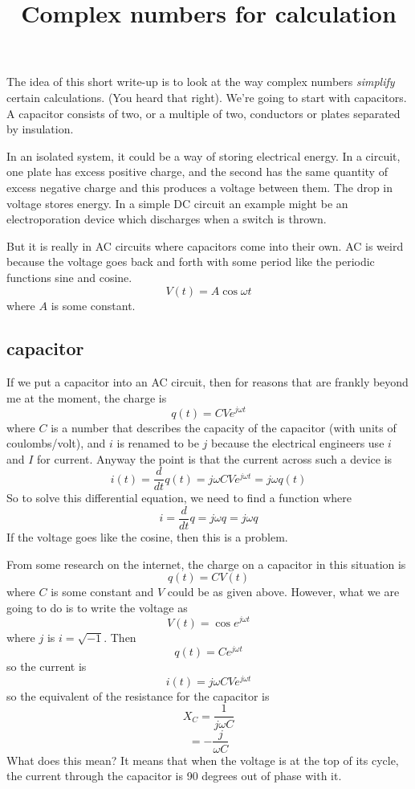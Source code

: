 \documentclass[11pt, oneside]{article}   	%
\title{Complex numbers for calculation}
\date{}							%
\begin{document}
\maketitle
\Large
\noindent
The idea of this short write-up is to look at the way complex numbers \emph{simplify} certain calculations.  (You heard that right).  We're going to start with capacitors.  A capacitor consists of two, or a multiple of two, conductors or plates separated by insulation.

In an isolated system, it could be a way of storing electrical energy.  In a circuit, one plate has excess positive charge, and the second has the same quantity of excess negative charge and this produces a voltage between them.  The drop in voltage stores energy.  In a simple DC circuit an example might be an electroporation device which discharges when a switch is thrown.  

But it is really in AC circuits where capacitors come into their own.  AC is weird because the voltage goes back and forth with some period like the periodic functions sine and cosine.
\[ V(t) = A \cos \omega t \]
where $A$ is some constant.

\subsection*{capacitor}
If we put a capacitor into an AC circuit, then for reasons that are frankly beyond me at the moment, the charge is
\[ q(t) = CVe^{j\omega t} \]
where $C$ is a number that describes the capacity of the capacitor (with units of coulombs/volt), and $i$ is renamed to be $j$ because the electrical engineers use $i$ and $I$ for current.  Anyway the point is that the current across such a device is
\[ i(t) = \frac{d}{dt} q(t)  = j\omega CV e^{j\omega t} =  j\omega q(t) \]
So to solve this differential equation, we need to find a function where
\[ i = \frac{d}{dt} q = j\omega q =  j\omega q \]
If the voltage goes like the cosine, then this is a problem.

From some research on the internet, the charge on a capacitor in this situation is
\[ q(t) = CV(t) \]
where $C$ is some constant and $V$ could be as given above.
However, what we are going to do is to write the voltage as
\[ V(t) = \cos e^{j\omega t}  \]
where $j$ is $i = \sqrt{-1}$.  Then
\[ q(t) = C e^{j\omega t}  \]
so the current is
\[ i(t) = j \omega C V e^{j\omega t}  \]
so the equivalent of the resistance for the capacitor is
\[ X_C = \frac{1}{j \omega C} \]
\[ = -\frac{j}{\omega C } \]
What does this mean?  It means that when the voltage is at the top of its cycle, the current through the capacitor is 90 degrees out of phase with it.
\end{document}
